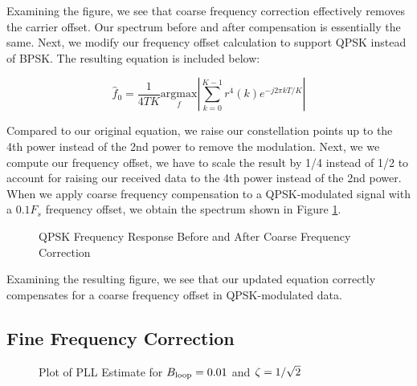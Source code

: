 \documentclass{article}
\begin{document}
\noindent Examining the figure, we see that coarse frequency correction effectively removes the carrier offset. Our spectrum before and after compensation is essentially the same. Next, we modify our frequency offset calculation to support QPSK instead of BPSK. The resulting equation is included below:

\begin{equation}
	\hat{f}_0 = \frac{1}{4TK}\underset{f}{\text{argmax}}\left\vert\sum_{k=0}^{K-1}{r^4(k)e^{-j2{\pi}kT/K}}\right\vert
\end{equation}

\noindent Compared to our original equation, we raise our constellation points up to the 4th power instead of the 2nd power to remove the modulation. Next, we we compute our frequency offset, we have to scale the result by 1/4 instead of 1/2 to account for raising our received data to the 4th power instead of the 2nd power. When we apply coarse frequency compensation to a QPSK-modulated signal with a $0.1F_s$ frequency offset, we obtain the spectrum shown in Figure \ref{fig::psd_qpsk_with_cfc}.
 
\begin{figure}[H]
	\centerline{}
	\caption{QPSK Frequency Response Before and After Coarse Frequency Correction}
	\label{fig::psd_qpsk_with_cfc}
\end{figure}

\noindent Examining the resulting figure, we see that our updated equation correctly compensates for a coarse frequency offset in QPSK-modulated data.

\subsection{Fine Frequency Correction}

\begin{figure}[H]
	\centerline{}
	\caption{Plot of PLL Estimate for $\protect{B_\text{loop}} = 0.01$ and $\protect{\zeta = 1/\sqrt{2}}$}
	\label{fig::convergence_Bloop_0p01_damp_sqrt_2}
\end{figure}
\end{document}
